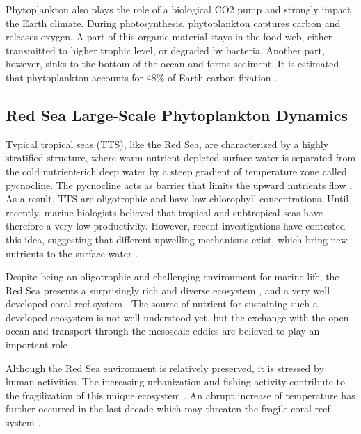 Phytoplankton also plays the role of a biological CO2 pump and strongly impact 
the Earth climate. During photosynthesis, phytoplankton captures carbon and 
releases oxygen. A part of this organic material stays in the food web, either 
transmitted to higher trophic level, or degraded  by bacteria. Another part, 
however, sinks to the bottom of the ocean and forms sediment. It is estimated 
that phytoplankton accounts for 48\% of Earth carbon fixation \citep{Pal2014}.

\subsection{Red Sea Large-Scale Phytoplankton Dynamics}

Typical tropical seas (TTS), like the Red Sea, are characterized by a highly 
stratified structure, where warm nutrient-depleted surface water is separated 
from the cold nutrient-rich deep water by a steep gradient of temperature zone 
called pycnocline. The pycnocline acts as barrier that limits the upward 
nutrients flow \citep{Mann2006}. As a result, TTS are oligotrophic and have low 
chlorophyll concentrations. Until recently, marine biologists believed that 
tropical and subtropical seas have therefore a very low productivity. However, 
recent investigations have contested this idea, suggesting that different 
upwelling mechanisms exist, which bring new nutrients to the surface water 
\citep{Mann2006}.

Despite being an oligotrophic and challenging environment for marine life, the 
Red Sea presents a surprisingly rich and diverse ecosystem \citep{Raitsos2011}, 
and a very well developed coral reef system \citep{Racault}. The source of 
nutrient for sustaining such a developed ecosystem is not well understood yet, 
but the exchange with the open ocean and transport through the mesoscale eddies 
are believed to play an important role \citep{Raitsos2013, Zhan2014}.

Although the Red Sea environment is relatively preserved, it is stressed by 
human activities. The increasing urbanization and fishing activity contribute to 
the fragilization of this unique ecosystem \citep{Acker2008}. An abrupt increase 
of temperature has further occurred in the last decade which may threaten the 
fragile coral reef system \citep{Raitsos2011}.

